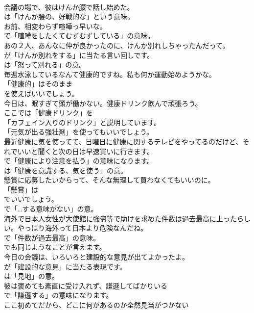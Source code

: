 \documentclass[8pt]{extreport}
\begin{document}
\begin{CJK}{UTF8}{min}
\\	会議の場で、彼はけんか腰で話し始めた。 
\\	は「けんか腰の、好戦的な」という意味。	
\\	お前、相変わらず喧嘩っ早いな。 
\\	で「喧嘩をしたくてむずむずしている」の意味。	
\\	あの２人、あんなに仲が良かったのに、けんか別れしちゃったんだって。 
\\	が「けんか別れをする」に当たる言い回しです。
\\	は「怒って別れる」の意。	
\\	毎週水泳しているなんて健康的ですね。私も何か運動始めようかな。 
\\	「健康的」はそのまま
\\	を使えばいいでしょう。	
\\	今日は、眠すぎて頭が働かない。健康ドリンク飲んで頑張ろう。 
\\	ここでは「健康ドリンク」を
\\	「カフェイン入りのドリンク」と説明しています。
\\	「元気が出る強壮剤」を使ってもいいでしょう。	
\\	最近健康に気を使ってて、日曜日に健康に関するテレビをやってるのだけど、それでいいと聞くと次の日は早速買いに行きます。 
\\	で「健康により注意を払う」の意味になります。
\\	は「健康を意識する、気を使う」の意。	
\\	懸賞に応募したいからって、そんな無理して買わなくてもいいのに。 
\\	「懸賞」は
\\	でいいでしょう。
\\	で「…する意味がない」の意。	
\\	海外で日本人女性が大使館に強盗等で助けを求めた件数は過去最高に上ったらしい。やっぱり海外って日本より危険なんだね。 
\\	で「件数が過去最高」の意味。
\\	でも同じようなことが言えます。	
\\	今日の会議は、いろいろと建設的な意見が出てよかったよ。 
\\	が「建設的な意見」に当たる表現です。
\\	は「見地」の意。	
\\	彼は褒めても素直に受け入れず、謙遜してばかりいる 
\\	で「謙遜する」の意味になります。	
\\	ここ初めてだから、どこに何があるのか全然見当がつかない 

\end{CJK}
\end{document}
